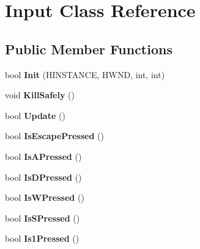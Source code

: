 \hypertarget{class_input}{\section{Input Class Reference}
\label{class_input}
}
\subsection*{Public Member Functions}
\begin{DoxyCompactItemize}
\item 
\hypertarget{class_input_adec7ee5f25d560be87198851025631d3}{bool {\bfseries Init} (H\-I\-N\-S\-T\-A\-N\-C\-E, H\-W\-N\-D, int, int)}\label{class_input_adec7ee5f25d560be87198851025631d3}

\item 
\hypertarget{class_input_a311b8d319dbdf08bf389f9837f8e3778}{void {\bfseries Kill\-Safely} ()}\label{class_input_a311b8d319dbdf08bf389f9837f8e3778}

\item 
\hypertarget{class_input_a576c6ed1d2161f686109374c6fe4d48c}{bool {\bfseries Update} ()}\label{class_input_a576c6ed1d2161f686109374c6fe4d48c}

\item 
\hypertarget{class_input_a32d9ba490a1bba324be7f9eac8834177}{bool {\bfseries Is\-Escape\-Pressed} ()}\label{class_input_a32d9ba490a1bba324be7f9eac8834177}

\item 
\hypertarget{class_input_a8dce8ecad7dba1dcaa23985384177c25}{bool {\bfseries Is\-A\-Pressed} ()}\label{class_input_a8dce8ecad7dba1dcaa23985384177c25}

\item 
\hypertarget{class_input_a65e6bd1d100dd9322b6d5d4188e329ec}{bool {\bfseries Is\-D\-Pressed} ()}\label{class_input_a65e6bd1d100dd9322b6d5d4188e329ec}

\item 
\hypertarget{class_input_a78048829744e16c2f949cba39d2cef1d}{bool {\bfseries Is\-W\-Pressed} ()}\label{class_input_a78048829744e16c2f949cba39d2cef1d}

\item 
\hypertarget{class_input_a039ce0117f0634a4c0c6597aad6a8bf2}{bool {\bfseries Is\-S\-Pressed} ()}\label{class_input_a039ce0117f0634a4c0c6597aad6a8bf2}

\item 
\hypertarget{class_input_a16068fc70836d7586f756d3c8d65a3f1}{bool {\bfseries Is1\-Pressed} ()}\label{class_input_a16068fc70836d7586f756d3c8d65a3f1}


\end{DoxyCompactItemize}
